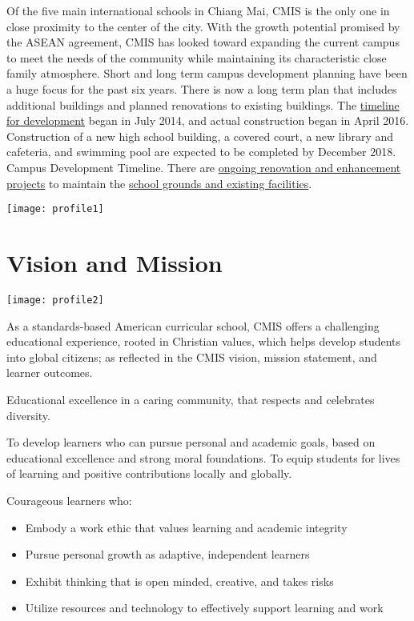
Of the five main international schools in Chiang Mai, CMIS is the only one in close proximity to the center of the city.  With the growth potential promised by the ASEAN agreement, CMIS has looked toward expanding the current campus to meet the needs of the community while maintaining its characteristic close family atmosphere.  Short and long term campus development planning have been a huge focus for the past six years. There is now a long term plan that includes additional buildings and planned renovations to existing buildings.  The \href{https://docs.google.com/spreadsheets/d/12H8OtZlda_OBTVfUOYvEg0qghC6U9Xz93vGASmJF1hQ/edit#gid=0}{timeline for development} began in July 2014, and actual construction began in April 2016.  Construction of a new high school building, a covered court, a new library and cafeteria, and swimming pool are expected to be completed by December 2018.  Campus Development Timeline.  There are \href{https://docs.google.com/presentation/d/1o_AcPdYb1572Wbm7vk79ssg7RzkQykBGOqrKGVhTArw/edit#slide=id.ga51c5f54b_0_41}{ongoing renovation and enhancement projects} to maintain the \href{https://docs.google.com/presentation/d/1BSJvdHXlQ7o2US1hnvFOyPIcvA3WEPCRc9XYJAqlNt4/edit#slide=id.g540d23d42_034}{school grounds and existing facilities}.

\texttt{[image: profile1]}

\section{Vision and Mission}

\texttt{[image: profile2]}

As a standards-based American curricular school, CMIS offers a challenging educational experience, rooted in Christian values, which helps develop students into global citizens; as reflected in the CMIS vision, mission statement, and learner outcomes.

Educational excellence in a caring community, that respects and celebrates diversity.

To develop learners who can pursue personal and academic goals, based on educational excellence and strong moral foundations. To equip students for lives of learning and positive contributions locally and globally.

Courageous learners who:
\begin{itemize}
\item Embody a work ethic that values learning and academic integrity
\item Pursue personal growth as adaptive, independent learners
\item Exhibit thinking that is open minded, creative, and takes risks
\item Utilize resources and technology to effectively support learning and work
\end{itemize}

